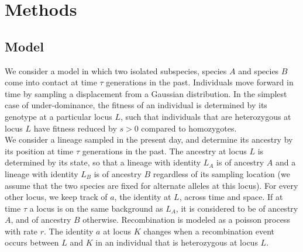 \documentclass[12pt]{amsart}
\begin{document}
	
\section{Methods}
\subsection{Model}
We consider a model in which two isolated subspecies, species $A$ and species $B$ come into contact at time $\tau$ generations in the past. Individuals move forward in time by sampling a displacement from a Gaussian distribution. In the simplest case of under-dominance, the fitness of an individual is determined by its genotype at a particular locus $L$, such that individuals that are heterozygous at locus $L$ have fitness reduced by $s>0$ compared to homozygotes.\\

We consider a lineage sampled in the present day, and determine its ancestry by its position at time $\tau$ generations in the past. The ancestry at locus $L$ is determined by its state, so that a lineage with identity $L_A$ is of ancestry $A$ and a lineage with identity $L_B$ is of ancestry $B$ regardless of its sampling location (we assume that the two species are fixed for alternate alleles at this locus). For every other locus, we keep track of $a$, the identity at $L$, across time and space. If at time $\tau$ a locus is on the same background as $L_A$, it is considered to be of ancestry $A$, and of ancestry $B$ otherwise. Recombination is modeled as a poisson process with rate $r$. The identity $a$ at locus $K$ changes when a recombination event occurs between $L$ and $K$ in an individual that is heterozygous at locus $L$. 
\\



\subsection{}
\end{document}
